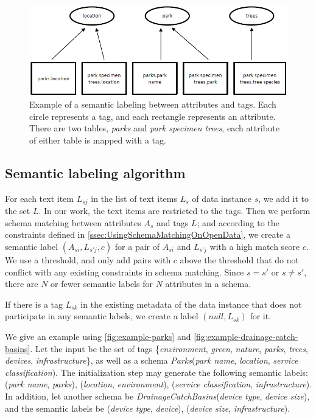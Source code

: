 \begin{figure}
    \centering
    \includegraphics[width=5in]{figures/example-semantic-labeling.png}
    \caption{Example of a semantic labeling between attributes and tags.
    Each circle represents a tag, and each rectangle represents an attribute. There are two tables, \textit{parks} and \textit{park specimen trees}, each attribute of either table is mapped with a tag.}
    \label{fig:example-semantic-labeling}
\end{figure}

\subsection{Semantic labeling algorithm}
\label{ssec:SemanticLabelingAlgorithm}

For each text item $L_{sj}$ in the list of text items $L_{s}$ of data instance $s$, we add it to the set $L$. In our work, the text items are restricted to the tags. Then we perform schema matching between attributes $A_{s}$ and tags $L$; and according to the constraints defined in \autoref{ssec:UsingSchemaMatchingOnOpenData}, we create a semantic label $(A_{si},L_{s'j},c)$ for a pair of $A_{si}$ and $L_{s'j}$ with a high match score $c$. We use a threshold, and only add pairs with $c$ above the threshold that do not conflict with any existing constraints in schema matching. Since $s=s'$ or $s\neq s'$, there are $N$ or fewer semantic labels for $N$ attributes in a schema.

If there is a tag $L_{sk}$ in the existing metadata of the data instance that does not participate in any semantic labels, we create a label $(null,L_{sk})$ for it.

We give an example using \autoref{fig:example-parks} and \autoref{fig:example-drainage-catch-basins}. Let the input be the set of tags \{\textit{environment}, \textit{green}, \textit{nature}, \textit{parks}, \textit{trees}, \textit{devices}, \textit{infrastructure}\}, as well as a schema \textit{Parks}(\textit{park name}, \textit{location}, \textit{service classification}). The initialization step may generate the following semantic labels: (\textit{park name}, \textit{parks}), (\textit{location}, \textit{environment}), (\textit{service classification}, \textit{infrastructure}). In addition, let another schema be \textit{DrainageCatchBasins}(\textit{device type}, \textit{device size}), and the semantic labels be (\textit{device type}, \textit{device}), (\textit{device size}, \textit{infrastructure}).

